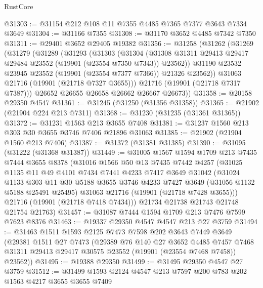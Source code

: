 \begin{lexlean}{RustCore}
\begin{coremodule}
@31303 := @31154 @212 @108 @11 @7355 @4485 @7365 @7377 @3643 @7334 @3649
@31304 := @31166 @7355
@31308 := @31170 @3652 @4485 @7342 @7350
@31311 := @29401 @3652 @29405 @19382
@31356 := @31258
    (@31262
      (@31269
        (@31279
          (@31289
            (@31293
              (@31303
                (@31304
                  (@31308 @31311 @29413 @29417 @29484 @23552 (@19901 (@23554 @7350 @7343)) @23562))
                @31190
                @23532
                @23945
                @23552
                (@19901 (@23554 @7377 @7366))
                @21326
                @23562))
            @31063
            @21716
            (@19901 (@21718 @7327 @3655)))
          @21716
          (@19901 (@21718 @7317 @7387)))
        @26652
        @26655
        @26658
        @26662
        @26667
        @26673))
@31358 := @20158 @29350 @4547
@31361 := @31245 (@31250 (@31356 @31358))
@31365 := @21902 (@21904 @224 @213 @7311)
@31368 := @31230 (@31235 (@31361 @31365))
@31372 := @31231 @1563 @213 @3655 @7408
@31381 := @31237 @1560 @213 @303 @30 @3655 @3746 @7406 @21896 @31063
@31385 := @21902 (@21904 @1560 @213 @7406)
@31387 := @31372 (@31381 @31385)
@31390 := @31095 (@31222 (@31368 @31387))
@31449 := @31005
    @1567
    @1594
    @1709
    @213
    @7435
    @7444
    @3655
    @8378
    (@31016
      @1566
      @50
      @13
      @7435
      @7442
      @4257
      (@31025
        @1135
        @11
        @49
        @4101
        @7434
        @7441
        @4233
        @7417
        @3649
        @31042
        (@31024
          @1133
          @303
          @11
          @30
          @5188
          @3655
          @3746
          @4233
          @7427
          @3649
          (@31056 @1132 @5188 @25491 @25495)
          @31063
          @21716
          (@19901 (@21718 @7428 @3655)))
        @21716
        (@19901 (@21718 @7418 @7434)))
      @21734
      @21738
      @21743
      @21748
      @21754
      @21763)
@31457 := @31087 @7444 @1594 @1709 @213 @7476 @7599 @7623 @8376
@31463 := @19337 @29350 @4547 @4547 @213 @27 @3759
@31494 := @31463
    @1511
    @1593
    @2125
    @7473
    @7598
    @202
    @3643
    @7449
    @3649
    (@29381
      @1511
      @27
      @7473
      (@29389
        @76
        @140
        @27
        @3652
        @4485
        @7457
        @7468
        @31311
        @29413
        @29417
        @30575
        @23552
        (@19901 (@23554 @7468 @7458))
        @23562))
@31495 := @19388 @29350
@31499 := @31495 @29350 @4547 @27 @3759
@31512 := @31499 @1593 @2124 @4547 @213 @7597 @200 @783 @202 @1563 @4217 @3655 @3655 @7409

\end{coremodule}
\end{lexlean}
